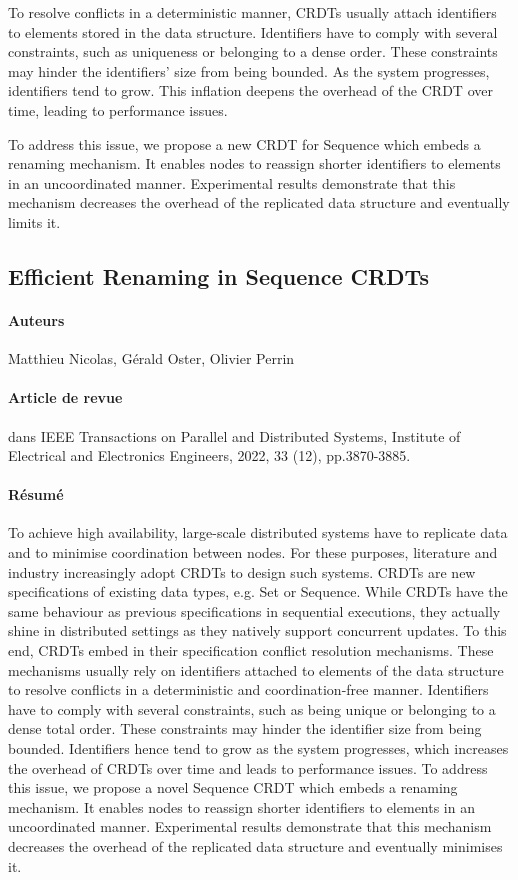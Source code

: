 To resolve conflicts in a deterministic manner, \acp{CRDT} usually attach identifiers to elements stored in the data structure.
Identifiers have to comply with several constraints, such as uniqueness or belonging to a dense order.
These constraints may hinder the identifiers' size from being bounded.
As the system progresses, identifiers tend to grow.
This inflation deepens the overhead of the \ac{CRDT} over time, leading to performance issues.

To address this issue, we propose a new CRDT for Sequence which embeds a renaming mechanism.
It enables nodes to reassign shorter identifiers to elements in an uncoordinated manner.
Experimental results demonstrate that this mechanism decreases the overhead of the replicated data structure and eventually limits it.

\subsection*{Efficient Renaming in Sequence CRDTs \cite{2022-rls-tpds-nicolas}}

\paragraph{Auteurs} Matthieu Nicolas, Gérald Oster, Olivier Perrin

\paragraph{Article de revue} dans IEEE Transactions on Parallel and Distributed Systems, Institute of Electrical and Electronics Engineers, 2022, 33 (12), pp.3870-3885.

\paragraph{Résumé}
To achieve high availability, large-scale distributed systems have to replicate data and to minimise coordination between nodes.
For these purposes, literature and industry increasingly adopt \acfp{CRDT} to design such systems.
\acp{CRDT} are new specifications of existing data types, e.g. Set or Sequence.
While \acp{CRDT} have the same behaviour as previous specifications in sequential executions, they actually shine in distributed settings as they natively support concurrent updates.
To this end, \acp{CRDT} embed in their specification conflict resolution mechanisms.
These mechanisms usually rely on identifiers attached to elements of the data structure to resolve conflicts in a deterministic and coordination-free manner.
Identifiers have to comply with several constraints, such as being unique or belonging to a dense total order.
These constraints may hinder the identifier size from being bounded.
Identifiers hence tend to grow as the system progresses, which increases the overhead of \acp{CRDT} over time and leads to performance issues.
To address this issue, we propose a novel Sequence \ac{CRDT} which embeds a renaming mechanism.
It enables nodes to reassign shorter identifiers to elements in an uncoordinated manner.
Experimental results demonstrate that this mechanism decreases the overhead of the replicated data structure and eventually minimises it.
